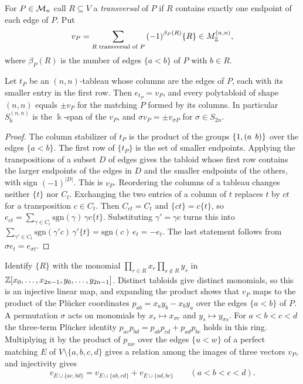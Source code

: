 For $P\in\mathcal{M}_n$ call $R\subseteq V$ a \emph{transversal} of $P$ if $R$ contains exactly one endpoint of each edge of $P$. Put
\[
v_P=\sum_{R\text{ transversal of }P}{(-1)}^{\beta_P(R)}\{R\}\in M^{(n,n)}_{\mathbb{Z}},
\]
where $\beta_P(R)$ is the number of edges $\{a<b\}$ of $P$ with $b\in R$.

\begin{lemma}\label{lem:vP}
Let $t_P$ be an $(n,n)$-tableau whose columns are the edges of $P$, each with its smaller entry in the first row. Then $e_{t_P}=v_P$, and every polytabloid of shape $(n,n)$ equals $\pm v_P$ for the matching $P$ formed by its columns. In particular $S^{(n,n)}_\Bbbk$ is the $\Bbbk$-span of the $v_P$, and $\sigma v_P=\pm v_{\sigma P}$ for $\sigma\in S_{2n}$.
\end{lemma}

\begin{proof}
The column stabilizer of $t_P$ is the product of the groups $\{1,(a\;\,b)\}$ over the edges $\{a<b\}$. The first row of $\{t_P\}$ is the set of smaller endpoints. Applying the transpositions of a subset $D$ of edges gives the tabloid whose first row contains the larger endpoints of the edges in $D$ and the smaller endpoints of the others, with sign ${(-1)}^{|D|}$. This is $v_P$. Reordering the columns of a tableau changes neither $\{t\}$ nor $C_t$. Exchanging the two entries of a column of $t$ replaces $t$ by $ct$ for a transposition $c\in C_t$. Then $C_{ct}=C_t$ and $\{ct\}=c\{t\}$, so $e_{ct}=\sum_{\gamma\in C_t}\mathrm{sgn}(\gamma)\,\gamma c\{t\}$. Substituting $\gamma'=\gamma c$ turns this into $\sum_{\gamma'\in C_t}\mathrm{sgn}(\gamma'c)\,\gamma'\{t\}=\mathrm{sgn}(c)\,e_t=-e_t$. The last statement follows from $\sigma e_t=e_{\sigma t}$.
\end{proof}

Identify $\{R\}$ with the monomial $\prod_{r\in R}x_r\prod_{s\notin R}y_s$ in $\mathbb{Z}[x_0,\dots,x_{2n-1},y_0,\dots,y_{2n-1}]$. Distinct tabloids give distinct monomials, so this is an injective linear map, and expanding the product shows that $v_P$ maps to the product of the Pl\"ucker coordinates $p_{ab}=x_{a}y_b-x_{b}y_a$ over the edges $\{a<b\}$ of $P$. A permutation $\sigma$ acts on monomials by $x_r\mapsto x_{\sigma r}$ and $y_s\mapsto y_{\sigma s}$. For $a<b<c<d$ the three-term Pl\"ucker identity $p_{ac}p_{bd}=p_{ab}p_{cd}+p_{ad}p_{bc}$ holds in this ring. Multiplying it by the product of $p_{uw}$ over the edges $\{u<w\}$ of a perfect matching $E$ of $V\setminus\{a,b,c,d\}$ gives a relation among the images of three vectors $v_P$, and injectivity gives
\begin{equation}\label{eq:plucker}
v_{E\cup\{ac,bd\}}=v_{E\cup\{ab,cd\}}+v_{E\cup\{ad,bc\}}\qquad(a<b<c<d).
\end{equation}

